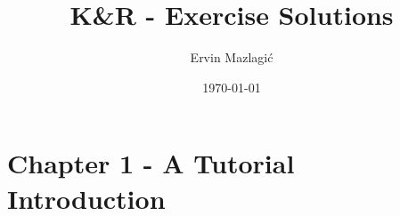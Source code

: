 \documentclass[10pt,a4paper]{article}
\author{Ervin Mazlagi\'c}
\date{\today}
\title{K\&R - Exercise Solutions}
\begin{document}
\maketitle
\tableofcontents
\clearpage

\section{Chapter 1 - A Tutorial Introduction}

\end{document}
